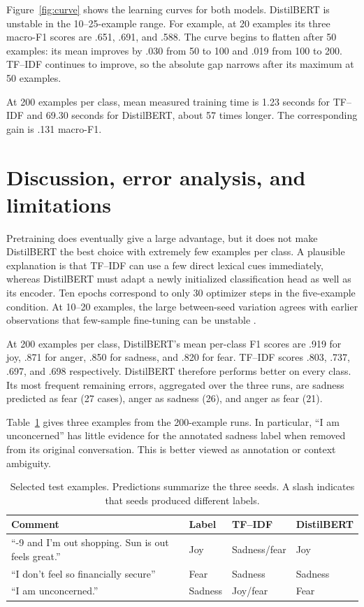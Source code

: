 \documentclass[11pt,a4paper]{article}
\begin{document}
Figure~\ref{fig:curve} shows the learning curves for both models. DistilBERT is
unstable in the 10--25-example range. For example, at 20 examples its three
macro-F1 scores are .651, .691, and .588. The curve begins
to flatten after 50 examples: its mean improves by .030 from 50 to 100 and .019
from 100 to 200. TF--IDF continues to improve, so the absolute gap narrows
after its maximum at 50 examples.

At 200 examples per class, mean measured training
time is 1.23 seconds for TF--IDF and 69.30 seconds for DistilBERT, about 57 times
longer. The corresponding gain is .131 macro-F1.

\section{Discussion, error analysis, and limitations}

Pretraining does eventually give a large advantage, but it does not make DistilBERT the best choice with extremely few
examples per class. A plausible explanation is that TF--IDF can use a few direct
lexical cues immediately, whereas DistilBERT must adapt a newly initialized
classification head as well as its encoder. Ten epochs correspond to only 30
optimizer steps in the five-example condition. At 10--20 examples, the large
between-seed variation agrees with earlier observations that few-sample
fine-tuning can be unstable \citep{zhang2020revisiting}.

At 200 examples per class, DistilBERT's mean per-class F1 scores are .919 for
joy, .871 for anger, .850 for sadness, and .820 for fear. TF--IDF scores .803,
.737, .697, and .698 respectively. DistilBERT therefore performs better on every class. Its most frequent remaining errors, aggregated over
the three runs, are sadness predicted as fear (27 cases), anger as sadness (26),
and anger as fear (21).

Table~\ref{tab:errors} gives three examples from the 200-example runs. In particular, ``I am unconcerned'' has little evidence
for the annotated sadness label when removed from its original conversation.
This is better viewed as annotation or context ambiguity.

\begin{table}[ht]
  \centering
  \caption{Selected test examples. Predictions summarize the three seeds. A
  slash indicates that seeds produced different labels.}
  \label{tab:errors}
  \small
  \begin{tabular}{p{.48\linewidth}lll}
    \toprule
    Comment & Label & TF--IDF & DistilBERT \\
    \midrule
    ``-9 and I’m out shopping. Sun is out feels great.'' & Joy & Sadness/fear & Joy \\
    ``I don't feel so financially secure'' & Fear & Sadness & Sadness \\
    ``I am unconcerned.'' & Sadness & Joy/fear & Fear \\
    \bottomrule
  \end{tabular}
\end{table}
\end{document}
